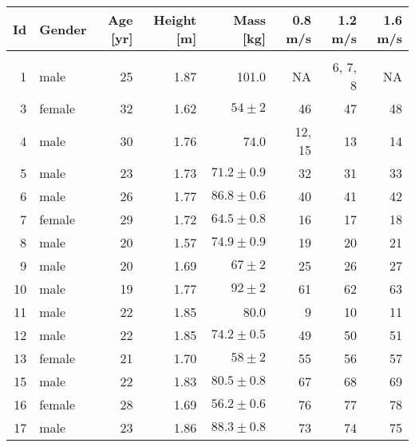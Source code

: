 \begin{tabular}{rlrrrrrr}
\toprule
 Id &  Gender &  Age [yr] & Height [m] &                     Mass [kg] & 0.8 m/s &  1.2 m/s & 1.6 m/s \\
\midrule
    &         &           &            &                               &         &          &         \\
  1 &    male &        25 &       1.87 &                         101.0 &      NA &  6, 7, 8 &      NA \\
  3 &  female &        32 &       1.62 &      $54\pm2$ &      46 &       47 &      48 \\
  4 &    male &        30 &       1.76 &                          74.0 &  12, 15 &       13 &      14 \\
  5 &    male &        23 &       1.73 &  $71.2\pm0.9$ &      32 &       31 &      33 \\
  6 &    male &        26 &       1.77 &  $86.8\pm0.6$ &      40 &       41 &      42 \\
  7 &  female &        29 &       1.72 &  $64.5\pm0.8$ &      16 &       17 &      18 \\
  8 &    male &        20 &       1.57 &  $74.9\pm0.9$ &      19 &       20 &      21 \\
  9 &    male &        20 &       1.69 &      $67\pm2$ &      25 &       26 &      27 \\
 10 &    male &        19 &       1.77 &      $92\pm2$ &      61 &       62 &      63 \\
 11 &    male &        22 &       1.85 &                          80.0 &       9 &       10 &      11 \\
 12 &    male &        22 &       1.85 &  $74.2\pm0.5$ &      49 &       50 &      51 \\
 13 &  female &        21 &       1.70 &      $58\pm2$ &      55 &       56 &      57 \\
 15 &    male &        22 &       1.83 &  $80.5\pm0.8$ &      67 &       68 &      69 \\
 16 &  female &        28 &       1.69 &  $56.2\pm0.6$ &      76 &       77 &      78 \\
 17 &    male &        23 &       1.86 &  $88.3\pm0.8$ &      73 &       74 &      75 \\
\bottomrule
\end{tabular}
